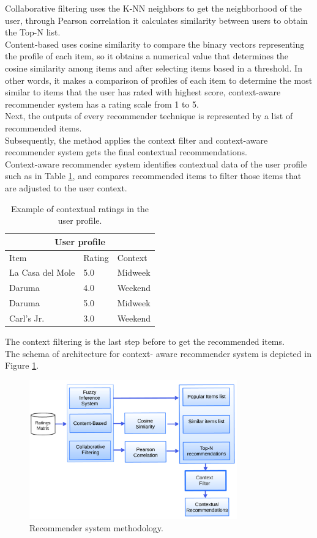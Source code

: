 Collaborative filtering uses the K-NN neighbors to get the 
neighborhood of the user, through Pearson correlation it 
calculates similarity between  users to obtain the Top-N list.  \\   
Content-based uses cosine similarity to compare the binary
vectors representing the profile of each item, so it obtains a
numerical value that determines the cosine similarity among items
and after selecting items  based in a threshold. 
In other words, it makes a comparison of profiles of each item to
determine the most similar to items that the user has rated with highest
score, context-aware recommender system has a rating scale 
from 1 to 5. \\
Next, the outputs of every recommender technique is represented by a
list of recommended items.\\
Subsequently, the method applies the context filter and
context-aware recommender system gets the final contextual
recommendations.\\  Context-aware recommender system identifies
contextual data of the user profile such as in Table  \ref{tab:2}, and
compares recommended items to filter those items that are adjusted to
the user context. 
\begin{table}[htb]
\small
\centering
\captionsetup{font=footnotesize}
\caption{Example of contextual ratings in the user profile.}
\label{tab:2}
\small
\begin{tabular}{lll}
\hline
\multicolumn{3}{c}{\textbf{User profile}} \\ \hline
Item & Rating & Context \\ \hline
La Casa del Mole & 5.0 & Midweek \\ 
Daruma           & 4.0 & Weekend \\ 
Daruma           & 5.0 & Midweek \\ 
Carl's Jr.       & 3.0 & Weekend \\ \hline
\end{tabular}
\end{table}
The context filtering is the last step before to
get the recommended items. \\The schema of architecture for context-
aware recommender system is depicted in Figure  \ref{fig:architecture}.
\begin{figure}
\captionsetup{font=footnotesize}
\centering
\includegraphics[width=0.80\textwidth]{img/archit-ta.png}
\caption{Recommender system methodology.}
\label{fig:architecture}   
\end{figure}
